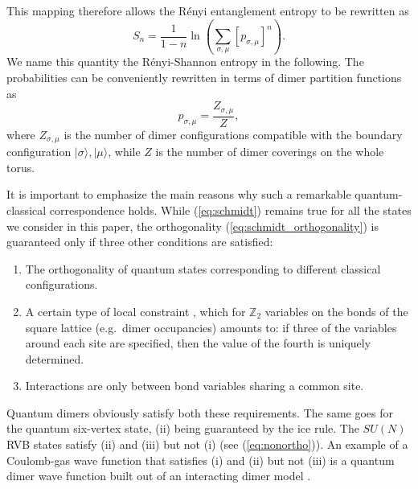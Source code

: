 \documentclass[11pt]{iopart}
\newcommand{\psm}{p_{\sigma,\mu}}
\begin{document}
This mapping therefore allows the R\'enyi entanglement entropy to be rewritten as
\begin{equation}
 S_n=\frac{1}{1-n}\ln \left(\sum_{\sigma,\mu}[\psm]^n\right).
 \label{Spsm}
\end{equation}
We name this quantity the R\'enyi-Shannon entropy in the following. The probabilities can be conveniently rewritten in terms of dimer partition functions as 
\begin{equation}
 \psm=\frac{Z_{\sigma,\mu}}{Z},
 \label{Zpsm}
\end{equation}
where $Z_{\sigma,\mu}$ is the number of dimer configurations compatible with the boundary configuration $|\sigma\rangle,|\mu\rangle$, while $Z$ is the number of dimer coverings on the whole torus. 

It is important to emphasize the main reasons why such a remarkable quantum-classical correspondence holds. While (\ref{eq:schmidt}) remains true for all the states we consider in this paper, the orthogonality (\ref{eq:schmidt_orthogonality}) is guaranteed only if three other conditions are satisfied:
\begin{enumerate}
 \item The orthogonality of quantum states corresponding to different classical configurations. 
 \item A certain type of local constraint \cite{Shannonee}, which for ${\mathbb Z}_2$ variables on the bonds of the square lattice (e.g.\ dimer occupancies) amounts to:  if three of the variables around each site are specified, then the value of the fourth is uniquely determined.
 \item Interactions are only between bond variables sharing a common site.
 \end{enumerate}
Quantum dimers obviously satisfy both these requirements. The same goes for the quantum six-vertex state, (ii) being guaranteed by the ice rule. The $SU(N)$ RVB states satisfy (ii) and (iii) but not (i) (see (\ref{eq:nonortho})). An example of a Coulomb-gas wave function that satisfies (i) and (ii) but not (iii) is a quantum dimer wave function built out of an interacting dimer model  \cite{Alet_dimers1,Alet_dimers2}. 
\end{document}
